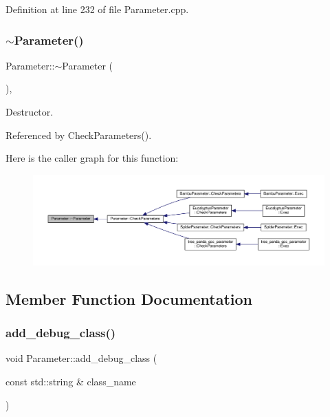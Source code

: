 Definition at line 232 of file Parameter.\+cpp.

\mbox{\label{classParameter_a6e2ade42a712f1d3675653329266e42d}} 
\subsubsection{\texorpdfstring{$\sim$\+Parameter()}{~Parameter()}}
{\footnotesize\ttfamily Parameter\+::$\sim$\+Parameter (\begin{DoxyParamCaption}{ }\end{DoxyParamCaption})\hspace{0.3cm}{\ttfamily [virtual]}, {\ttfamily [default]}}



Destructor. 



Referenced by Check\+Parameters().

Here is the caller graph for this function\+:
\nopagebreak
\begin{figure}[H]
\begin{center}
\leavevmode
\includegraphics[width=350pt]{dc/dab/classParameter_a6e2ade42a712f1d3675653329266e42d_icgraph}
\end{center}
\end{figure}


\subsection{Member Function Documentation}
\mbox{\label{classParameter_a23133c375ea48e8584252e638d00dc89}} 
\subsubsection{\texorpdfstring{add\+\_\+debug\+\_\+class()}{add\_debug\_class()}}
{\footnotesize\ttfamily void Parameter\+::add\+\_\+debug\+\_\+class (\begin{DoxyParamCaption}\item[{const std\+::string \&}]{class\+\_\+name }\end{DoxyParamCaption})}




